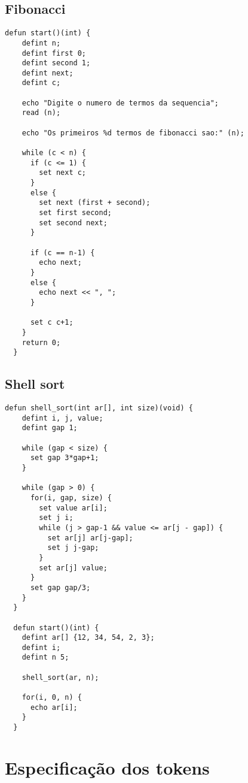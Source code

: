 \documentclass[
  12pt,				%
  oneside,			%
  a4paper,			%
  english,			%
  french,				%
  spanish,			%
  brazil,				%
]{abntex2}
\begin{document}
\section{Fibonacci}
\label{sec:fibonacci}

\begin{lstlisting}[label=code:fibonacci,caption=Programa Fibonacci]
  defun start()(int) {
    defint n;
    defint first 0;
    defint second 1;
    defint next;
    defint c;

    echo "Digite o numero de termos da sequencia";
    read (n);

    echo "Os primeiros %d termos de fibonacci sao:" (n);

    while (c < n) {
      if (c <= 1) {
        set next c;
      }
      else {
        set next (first + second);
        set first second;
        set second next;
      }

      if (c == n-1) {
        echo next;
      }
      else {
        echo next << ", ";
      }

      set c c+1;
    }
    return 0;
  }
\end{lstlisting}

\section{Shell sort}
\label{sec:shell-sort}

\begin{lstlisting}[label=code:shell-sort,caption=Programa do shell
  sort]
  defun shell_sort(int ar[], int size)(void) {
    defint i, j, value;
    defint gap 1;
    
    while (gap < size) {
      set gap 3*gap+1;
    }

    while (gap > 0) {
      for(i, gap, size) {
        set value ar[i];
        set j i;
        while (j > gap-1 && value <= ar[j - gap]) {
          set ar[j] ar[j-gap];
          set j j-gap;
        }
        set ar[j] value;
      }
      set gap gap/3;
    }
  }

  defun start()(int) {
    defint ar[] {12, 34, 54, 2, 3};
    defint i;
    defint n 5;

    shell_sort(ar, n);

    for(i, 0, n) {
      echo ar[i];
    }
  }

\end{lstlisting}


\chapter{Especificação dos tokens}
\label{cha:especificacao-dos-tokens}
\end{document}
